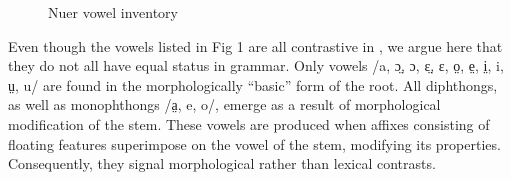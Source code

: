 \documentclass[output=paper,newtxmath,modfonts,nonflat,draftmode]{langsci/langscibook}
\begin{document}
\begin{figure}
%
	\caption{Nuer vowel inventory}
	\label{fig:monich:1}
\end{figure}



Even though the vowels listed in Fig 1 are all contrastive in , we argue here that they do not all have equal status in  grammar. Only vowels  /a, ɔ̤, ɔ, ɛ̤, ɛ, o̤, e̤, i̤, i, ṳ, u/ are found in the morphologically “basic” form of the root. All diphthongs, as well as monophthongs /a̤, e, o/, emerge as a result of morphological modification of the stem. These vowels are produced when affixes consisting of floating features superimpose on the vowel of the stem, modifying its properties. Consequently, they signal morphological rather than lexical contrasts.
\end{document}
